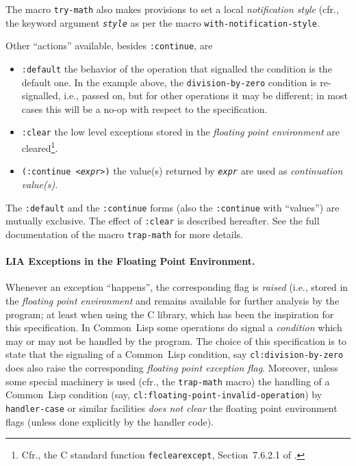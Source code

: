 \documentclass[10pt,fleqn]{article}
\newcommand{\CL}{\textsf{Common~Lisp}}
\newcommand{\CLang}{\textsf{C}}
\newcommand{\code}[1]{\texttt{#1}}
\newcommand{\clieeeterm}[1]{\textit{#1}}
\newcommand{\clterm}[1]{\textit{#1}}
\begin{document}
The macro \code{try-math} also makes provisions to set a local \emph{notification
  style} (cfr., the keyword argument \textit{\code{style}} as per the
macro \code{with-notification-style}.

Other ``actions'' available, besides \code{:continue}, are
\begin{itemize}
\item\code{:default} the behavior of the operation that signalled
  the condition is the default one. In the example above, the
  \code{division-by-zero} condition is re-signalled, i.e., passed
  on, but for other operations it may be different; in most cases this
  will be a no-op with respect to the specification.
    
\item\code{:clear} the low level exceptions stored in the
  \emph{floating point environment} are cleared\footnote{Cfr.,
    the \CLang{} standard function \code{feclearexcept},
    Section~7.6.2.1 of \cite{2018:C18}.}.

\item\code{(:continue <\textit{expr}>)} the value(s) returned by
  \code{\textit{expr}} are used as \emph{continuation value(s)}.
\end{itemize}
The \code{:default} and the \code{:continue} forms (also the
\code{:continue} with ``values'') are mutually exclusive.  The effect
of \code{:clear} is described hereafter. See the full documentation of
the macro \code{trap-math} for more details.

\paragraph{LIA Exceptions in the Floating Point Environment.} Whenever
an exception ``happens'', the corresponding flag is \emph{raised}
(i.e., stored in the \emph{floating point environment} and remains
available for further analysis by the program; at least when using the
\CLang{} library, which has been the inspiration for this
specification.  In \CL{} some operations do signal a
\clterm{condition} which may or may not be handled by the program.
The choice of this specification is to state that the signaling of a
\CL{} condition, say \code{cl:division-by-zero} does also raise the
corresponding \clieeeterm{floating point exception flag}.  Moreover,
unless some special machinery is used (cfr., the
\code{trap-math} macro) the handling of a \CL{} condition
(say, \code{cl:floating-point-invalid-operation}) by
\code{handler-case} or similar facilities \emph{does not clear} the
floating point environment flags (unless done explicitly by the
handler code).
\end{document}
